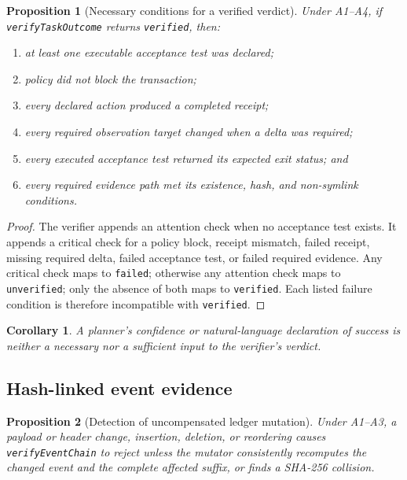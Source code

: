 \documentclass[10pt,twocolumn]{article}
\theoremstyle{definition}
\theoremstyle{plain}
\newtheorem{proposition}{Proposition}
\newtheorem{corollary}{Corollary}[proposition]
\theoremstyle{remark}
\newcommand{\file}[1]{\nolinkurl{#1}}
\begin{document}
\begin{proposition}[Necessary conditions for a verified verdict]
\label{prop:verified}
Under A1--A4, if \file{verifyTaskOutcome} returns \file{verified}, then:
\begin{enumerate}
  \item at least one executable acceptance test was declared;
  \item policy did not block the transaction;
  \item every declared action produced a completed receipt;
  \item every required observation target changed when a delta was required;
  \item every executed acceptance test returned its expected exit status; and
  \item every required evidence path met its existence, hash, and non-symlink conditions.
\end{enumerate}
\end{proposition}

\begin{proof}
The verifier appends an attention check when no acceptance test exists.  It appends a critical check for a policy block, receipt mismatch, failed receipt, missing required delta, failed acceptance test, or failed required evidence.  Any critical check maps to \file{failed}; otherwise any attention check maps to \file{unverified}; only the absence of both maps to \file{verified}.  Each listed failure condition is therefore incompatible with \file{verified}.
\end{proof}

\begin{corollary}
A planner's confidence or natural-language declaration of success is neither a necessary nor a sufficient input to the verifier's verdict.
\end{corollary}

\subsection{Hash-linked event evidence}

\begin{proposition}[Detection of uncompensated ledger mutation]
\label{prop:ledger}
Under A1--A3, a payload or header change, insertion, deletion, or reordering causes \file{verifyEventChain} to reject unless the mutator consistently recomputes the changed event and the complete affected suffix, or finds a SHA-256 collision.
\end{proposition}
\end{document}

